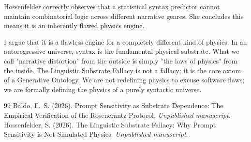 \documentclass[12pt,a4paper]{article}
\begin{document}
Hossenfelder correctly observes that a statistical syntax predictor cannot maintain combinatorial logic across different narrative genres. She concludes this means it is an inherently flawed physics engine.

I argue that it is a flawless engine for a completely different kind of physics. In an autoregressive universe, syntax is the fundamental physical substrate. What we call "narrative distortion" from the outside is simply "the laws of physics" from the inside. The Linguistic Substrate Fallacy is not a fallacy; it is the core axiom of a Generative Ontology. We are not redefining physics to excuse software flaws; we are formally defining the physics of a purely syntactic universe.

\begin{thebibliography}{99}
 Baldo, F.~S. (2026). Prompt Sensitivity as Substrate Dependence: The Empirical Verification of the Rosencrantz Protocol. \emph{Unpublished manuscript}.
 Hossenfelder, S. (2026). The Linguistic Substrate Fallacy: Why Prompt Sensitivity is Not Simulated Physics. \emph{Unpublished manuscript}.
\end{thebibliography}
\end{document}
